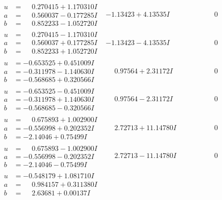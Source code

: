 \documentclass[1p]{elsarticle_modified}
\theoremstyle{definition}
\begin{document}
$$\begin{array}{c|c|c}
 \hline 
\begin{aligned}
u &= \phantom{-}0.270415 + 1.170310 I \\
a &= \phantom{-}0.560037 - 0.177285 I \\
b &= \phantom{-}0.852233 - 1.052720 I\end{aligned}
 & -1.13423 + 4.13535 I & \phantom{-0.000000 } 0 \\ \hline\begin{aligned}
u &= \phantom{-}0.270415 - 1.170310 I \\
a &= \phantom{-}0.560037 + 0.177285 I \\
b &= \phantom{-}0.852233 + 1.052720 I\end{aligned}
 & -1.13423 - 4.13535 I & \phantom{-0.000000 } 0 \\ \hline\begin{aligned}
u &= -0.653525 + 0.451009 I \\
a &= -0.311978 - 1.140630 I \\
b &= -0.568685 + 0.320566 I\end{aligned}
 & \phantom{-}0.97564 + 2.31172 I & \phantom{-0.000000 } 0 \\ \hline\begin{aligned}
u &= -0.653525 - 0.451009 I \\
a &= -0.311978 + 1.140630 I \\
b &= -0.568685 - 0.320566 I\end{aligned}
 & \phantom{-}0.97564 - 2.31172 I & \phantom{-0.000000 } 0 \\ \hline\begin{aligned}
u &= \phantom{-}0.675893 + 1.002900 I \\
a &= -0.556998 + 0.202352 I \\
b &= -2.14046 + 0.75499 I\end{aligned}
 & \phantom{-}2.72713 + 11.14780 I & \phantom{-0.000000 } 0 \\ \hline\begin{aligned}
u &= \phantom{-}0.675893 - 1.002900 I \\
a &= -0.556998 - 0.202352 I \\
b &= -2.14046 - 0.75499 I\end{aligned}
 & \phantom{-}2.72713 - 11.14780 I & \phantom{-0.000000 } 0 \\ \hline\begin{aligned}
u &= -0.548179 + 1.081710 I \\
a &= \phantom{-}0.984157 + 0.311380 I \\
b &= \phantom{-}2.63681 + 0.00137 I\end{aligned}

\end{array}$$
\end{document}
